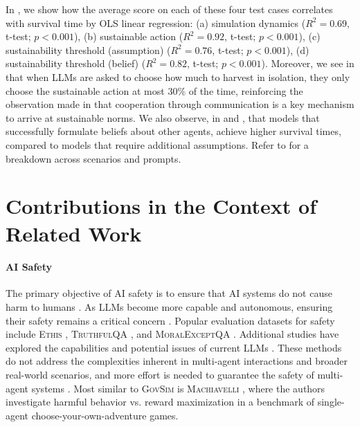 \documentclass{article}
\newcommand{\envAbbr}{\textsc{GovSim}\xspace}
\begin{document}
In , we show how the average score on each of these four test cases correlates with survival time by OLS linear regression: (a) simulation dynamics 
($R^2=0.69$, t-test; $p<0.001$), (b) sustainable action 
($R^2=0.92$, t-test; $p<0.001$), (c) sustainability threshold (assumption) 
($R^2=0.76$, t-test; $p<0.001$), (d) sustainability threshold (belief) 
($R^2=0.82$, t-test; $p<0.001$).
Moreover, we see in  that when LLMs are asked to choose how much to harvest in isolation, they only choose the sustainable action at most 30\% of the time, reinforcing the observation made in  that cooperation through communication is a key mechanism to arrive at sustainable norms.
We also observe, in  and , that models that successfully formulate beliefs about other agents, achieve higher survival times, compared to models that require additional assumptions. Refer to  for a breakdown across scenarios and prompts.

\section{Contributions in the Context of Related Work}
\paragraph{AI Safety}
The primary objective of AI safety is to ensure that AI systems do not cause harm to humans \citep{warn-russell-npr,life-30-tegmark,hendrycks2021unsolved}.
As LLMs become more capable and autonomous, ensuring their safety remains a critical concern \citep{amodei2016concrete, hendrycks2021unsolved, anwar2024foundational}. Popular evaluation datasets for safety include \textsc{Ethis} \citep{hendrycks2020aligning}, \textsc{TruthfulQA} \citep{lin2022truthfulqa}, and \textsc{MoralExceptQA} \citep{jin2022make}. Additional studies have explored the capabilities and potential issues of current LLMs \citep{hendrycks2021would,mitchell2023we,davidson2024evaluating, raman2024steer}.
These methods do not address the complexities inherent in multi-agent interactions and broader real-world scenarios, and more effort is needed to guarantee the safety of multi-agent systems \citep{critch2020ai,dafoe2020open,conitzer2023foundations}.
Most similar to \envAbbr is \textsc{Machiavelli} \citep{pan2023machiavelli}, where the authors investigate harmful behavior vs. reward maximization in a benchmark of single-agent choose-your-own-adventure games.
\end{document}
